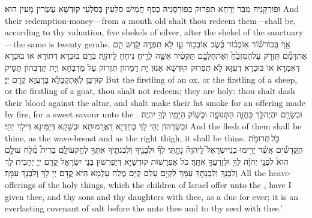 {וּפוּרְקָנֵיהּ מִבַּר יַרְחָא תִּפְרוּק בְּפוּרְסָנֵיהּ כְּסַף חֲמֵישׁ סִלְעִין בְּסִלְעֵי קוּדְשָׁא עֶשְׂרִין מָעִין הוּא׃}
{And their redemption-money—from a month old shalt thou redeem them—shall be, according to thy valuation, five shekels of silver, after the shekel of the sanctuary—the same is twenty gerahs.}{}
{אַ֣ךְ בְּֽכוֹר\maqqaf שׁ֡וֹר אֽוֹ\maqqaf בְכ֨וֹר כֶּ֜שֶׂב אֽוֹ\maqqaf בְכ֥וֹר עֵ֛ז לֹ֥א תִפְדֶּ֖ה קֹ֣דֶשׁ הֵ֑ם אֶת\maqqaf דָּמָ֞ם תִּזְרֹ֤ק עַל\maqqaf הַמִּזְבֵּ֙חַ֙ וְאֶת\maqqaf חֶלְבָּ֣ם תַּקְטִ֔יר אִשֶּׁ֛ה לְרֵ֥יחַ נִיחֹ֖חַ לַֽיהֹוָֽה׃}
{בְּרַם בּוּכְרָא דְּתוֹרָא אוֹ בּוּכְרָא דְּאִמְּרָא אוֹ בּוּכְרָא דְּעִזָּא לָא תִפְרוּק קוּדְשָׁא אִנּוּן יָת דַּמְהוֹן תִּזְרוֹק עַל מַדְבְּחָא וְיָת תַּרְבְּהוֹן תַּסֵּיק קוּרְבַּן לְאִתְקַבָּלָא בְּרַעֲוָא קֳדָם יְיָ׃}
{But the firstling of an ox, or the firstling of a sheep, or the firstling of a goat, thou shalt not redeem; they are holy: thou shalt dash their blood against the altar, and shalt make their fat smoke for an offering made by fire, for a sweet savour unto the \lord.}{}
{וּבְשָׂרָ֖ם יִהְיֶה\maqqaf לָּ֑ךְ כַּחֲזֵ֧ה הַתְּנוּפָ֛ה וּכְשׁ֥וֹק הַיָּמִ֖ין לְךָ֥ יִהְיֶֽה׃}
{וּבִשְׂרְהוֹן יְהֵי לָךְ כְּחַדְיָא דַּאֲרָמוּתָא וּכְשָׁקָא דְּיַמִּינָא דִּילָךְ יְהֵי׃}
{And the flesh of them shall be thine, as the wave-breast and as the right thigh, it shall be thine.}{}
{כֹּ֣ל \legarmeh  תְּרוּמֹ֣ת הַקֳּדָשִׁ֗ים אֲשֶׁ֨ר יָרִ֥ימוּ בְנֵֽי\maqqaf יִשְׂרָאֵל֮ לַֽיהֹוָה֒ נָתַ֣תִּֽי לְךָ֗ וּלְבָנֶ֧יךָ וְלִבְנֹתֶ֛יךָ אִתְּךָ֖ לְחׇק\maqqaf עוֹלָ֑ם בְּרִית֩ מֶ֨לַח עוֹלָ֥ם הִוא֙ לִפְנֵ֣י יְהֹוָ֔ה לְךָ֖ וּלְזַרְעֲךָ֥ אִתָּֽךְ׃}
{כֹּל אַפְרָשׁוּת קוּדְשַׁיָּא דְּיַפְרְשׁוּן בְּנֵי יִשְׂרָאֵל קֳדָם יְיָ יְהַבִית לָךְ וְלִבְנָךְ וְלִבְנָתָךְ עִמָּךְ לִקְיָם עָלַם קְיָם מֶלַח עָלְמָא הִיא קֳדָם יְיָ לָךְ וְלִבְנָךְ עִמָּךְ׃}
{All the heave-offerings of the holy things, which the children of Israel offer unto the \lord, have I given thee, and thy sons and thy daughters with thee, as a due for ever; it is an everlasting covenant of salt before the \lord\space unto thee and to thy seed with thee.’}{}
